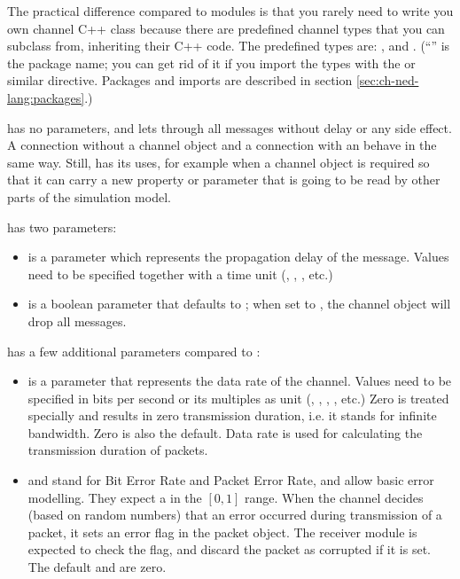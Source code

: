 The practical difference compared to modules is that you rarely need to write you own
channel C++ class because there are predefined channel types that you can
subclass from, inheriting their C++ code. The predefined types are:
,  and .
(``'' is the package name; you can get rid of it if you import the types
with the  or similar directive. Packages and imports
are described in section \ref{sec:ch-ned-lang:packages}.)

 has no parameters, and lets through all messages without
delay or any side effect. A connection without a channel object
and a connection with an  behave in the same way.
Still,  has its uses, for example when a channel object
is required so that it can carry a new property or parameter that is
going to be read by other parts of the simulation model.

 has two parameters:

\begin{itemize}
    \item {} is a  parameter which represents the
          propagation delay of the message. Values need to be specified
          together with a time unit (, , , etc.)
    \item {} is a boolean parameter that defaults to ;
          when set to , the channel object will drop all messages.
\end{itemize}

 has a few additional parameters compared to :

\begin{itemize}
    \item {} is a  parameter that represents the
          data rate of the channel. Values need to be specified
          in bits per second or its multiples as unit (,
          , , , etc.) Zero is treated
          specially and results in zero transmission duration, i.e.
          it stands for infinite bandwidth. Zero is also the default.
          Data rate is used for calculating the transmission duration of
          packets.
    \item {} and  stand for Bit Error Rate and Packet Error Rate,
          and allow basic error modelling. They expect a 
          in the $[0,1]$ range. When the channel decides (based on random
          numbers) that an error occurred during transmission of a packet,
          it sets an error flag in the packet object. The receiver
          module is expected to check the flag, and discard the packet
          as corrupted if it is set. The default  and 
          are zero.
\end{itemize}

